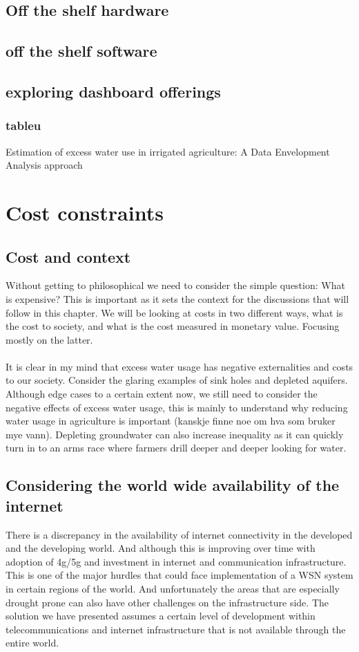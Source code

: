 \documentclass[]{uiophd}
\begin{document}
\section{Off the shelf hardware}
\section{off the shelf software}
\section{exploring dashboard offerings}
\subsection{tableu}

Estimation of excess water use in irrigated agriculture: A Data Envelopment Analysis approach

\chapter{Cost constraints}
\section{Cost and context}
Without getting to philosophical we need to consider the simple question: What is expensive? This is important as it sets the context for the discussions that will follow in this chapter. We will be looking at costs in two different ways, what is the cost to society, and what is the cost measured in monetary value. Focusing mostly on the latter. 
\\\\
It is clear in my mind that excess water usage has negative externalities and costs to our society. Consider the glaring examples of sink holes and depleted aquifers. Although edge cases to a certain extent now, we still need to consider the negative effects of excess water usage, this is mainly to understand why reducing water usage in agriculture is important (kanskje finne noe om hva som bruker mye vann). Depleting groundwater can also increase inequality as it can quickly turn in to an arms race where farmers drill deeper and deeper looking for water.
\section{Considering the world wide availability of the internet}
There is a discrepancy in the availability of internet connectivity in the developed and the developing world. And although this is improving over time with adoption of 4g/5g and investment in internet and communication infrastructure. This is one of the major hurdles that could face implementation of a WSN system in certain regions of the world. And unfortunately the areas that are especially drought prone can also have other challenges on the infrastructure side. The solution we have presented assumes a certain level of development within telecommunications and internet infrastructure that is not available through the entire world.
\end{document}
